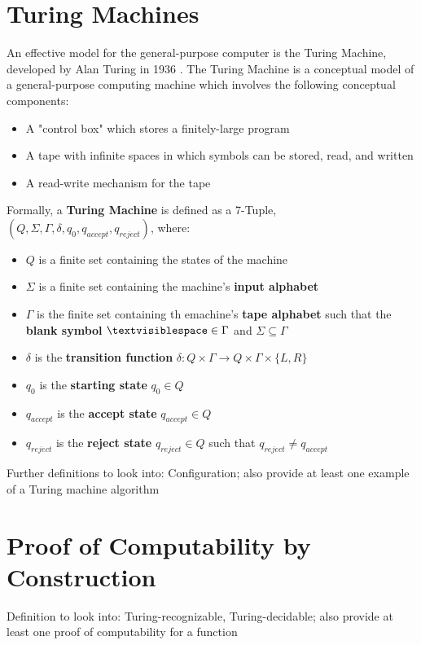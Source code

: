 \documentclass{article}
\begin{document}
\section{Turing Machines}
An effective model for the general-purpose computer is the Turing Machine, developed by Alan Turing in 1936 \cite{2}.  The Turing Machine is a conceptual model of a general-purpose computing machine which involves the following conceptual components:
\begin{itemize}
	\item A "control box" which stores a finitely-large program
	\item A tape with infinite spaces in which symbols can be stored, read, and written
	\item A read-write mechanism for the tape \cite{3}
\end{itemize}
\noindent Formally, a \textbf{Turing Machine} is defined as a 7-Tuple, $(Q, \Sigma, \Gamma, \delta, q_{0}, q_{accept}, q_{reject})$, where:
\begin{itemize}
	\item $Q$ is a finite set containing the states of the machine
	\item $\Sigma$ is a finite set containing the machine's \textbf{input alphabet}
	\item $\Gamma$ is the finite set containing th emachine's \textbf{tape alphabet} such that the \textbf{blank symbol} $\textvisiblespace \in \Gamma$ and $\Sigma \subseteq \Gamma$
	\item $\delta$ is the \textbf{transition function} $\delta: Q \times \Gamma \to Q \times \Gamma \times \{L, R\}$
	\item $q_{0}$ is the \textbf{starting state} $q_{0} \in Q$
	\item $q_{accept}$ is the \textbf{accept state} $q_{accept} \in Q$
	\item $q_{reject}$ is the \textbf{reject state} $q_{reject} \in Q$ such that $q_{reject} \neq q_{accept}$ \cite{2}
\end{itemize}
\noindent Further definitions to look into: Configuration; also provide at least one example of a Turing machine algorithm

\section{Proof of Computability by Construction}
Definition to look into: Turing-recognizable, Turing-decidable; also provide at least one proof of computability for a function
\end{document}
